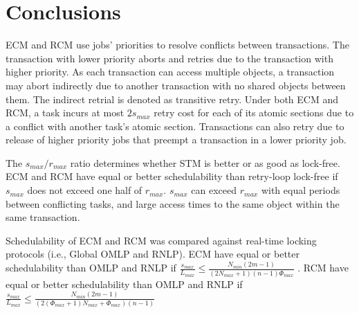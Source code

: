 \section{Conclusions}
\label{sec:ecm-rcm-conclusions}
%
ECM and RCM use jobs' priorities to resolve conflicts between transactions. The transaction with lower priority aborts and retries due to the transaction with higher priority. As each transaction can access multiple objects, a transaction may abort indirectly due to another transaction with no shared objects between them. The indirect retrial is denoted as transitive retry. Under both ECM and RCM, a task incurs at most $2s_{max}$ retry cost for each of its atomic sections due to a conflict with another task's atomic section. Transactions can also retry due to release of higher priority jobs that preempt a transaction in a lower priority job. 

The $s_{max}/r_{max}$ ratio determines whether STM is better or as good as lock-free. ECM and RCM have equal or better schedulability than retry-loop lock-free if $s_{max}$ does not exceed one half of $r_{max}$. $s_{max}$ can exceed $r_{max}$ with equal periods between conflicting tasks, and large access times to the same object within the same transaction.

Schedulability of ECM and RCM was compared against real-time locking protocols (i.e., Global OMLP and RNLP). ECM have equal or better schedulability than OMLP and RNLP if 
%
$
\frac{s_{max}}{L_{max}} \le \frac{N_{min}\left(2m-1\right)}{\left(2N_{max}+1\right)(n-1)\Phi_{max}}
$ .
%
RCM have equal or better schedulability than OMLP and RNLP if 
$
\frac{s_{max}}{L_{max}} \le \frac{N_{min}\left(2m-1\right)}{\left(2\left(\Phi_{max}+1\right)N_{max}+\Phi_{max}\right)(n-1)}
$